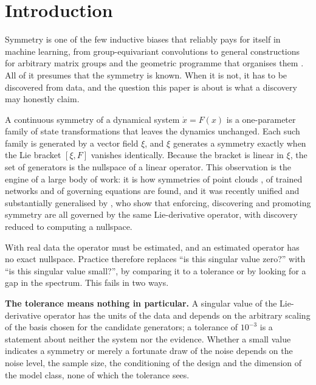 \section{Introduction}

Symmetry is one of the few inductive biases that reliably pays for itself in
machine learning, from group-equivariant convolutions
\citep{cohen2016group,kondor2018generalization} to general constructions for
arbitrary matrix groups \citep{finzi2021practical} and the geometric programme
that organises them \citep{bronstein2021geometric}. All of it presumes that
the symmetry is known. When it is not, it has to be discovered from data, and
the question this paper is about is what a discovery may honestly claim.

A continuous symmetry of a dynamical system $\dot x = F(x)$ is a one-parameter
family of state transformations that leaves the dynamics unchanged. Each such
family is generated by a vector field $\xi$, and $\xi$ generates a symmetry
exactly when the Lie bracket $[\xi,F]$ vanishes identically. Because the
bracket is linear in $\xi$, the set of generators is the nullspace of a linear
operator. This observation is the engine of a large body of work: it is how
symmetries of point clouds \citep{cahill2023liepca}, of trained networks
\citep{moskalev2022liegg,gruver2023lie} and of governing equations
\citep{kaiser2018discovering} are found, and it was recently unified and
substantially generalised by \citet{otto2025unified}, who show that enforcing,
discovering and promoting symmetry are all governed by the same Lie-derivative
operator, with discovery reduced to computing a nullspace.

With real data the operator must be estimated, and an estimated operator has
no exact nullspace. Practice therefore replaces ``is this singular value
zero?'' with ``is this singular value small?'', by comparing it to a tolerance
or by looking for a gap in the spectrum. This fails in two ways.

\textbf{The tolerance means nothing in particular.} A singular value of the
Lie-derivative operator has the units of the data and depends on the arbitrary
scaling of the basis chosen for the candidate generators; a tolerance of
$10^{-3}$ is a statement about neither the system nor the evidence. Whether a
small value indicates a symmetry or merely a fortunate draw of the noise
depends on the noise level, the sample size, the conditioning of the design
and the dimension of the model class, none of which the tolerance sees.


